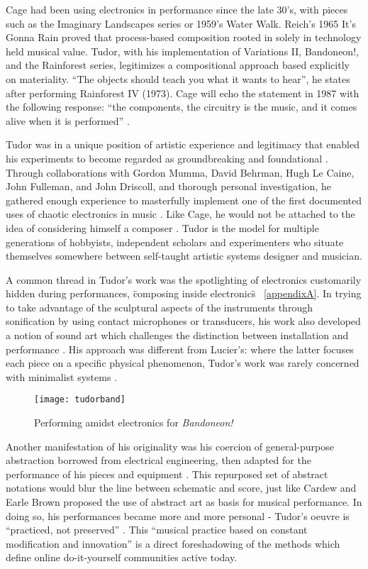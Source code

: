 \begin{itemize}
Cage had been using electronics in performance since the late 30’s, with pieces such as the Imaginary Landscapes series or 1959’s Water Walk. Reich’s 1965 It’s Gonna Rain proved that process-based composition rooted in solely in technology held musical value. Tudor, with his implementation of Variations II, Bandoneon!, and the Rainforest series, legitimizes a compositional approach based explicitly on materiality. “The objects should teach you what it wants to hear”, he states after performing Rainforest IV (1973). Cage will echo the statement in 1987 with the following response: “the components, the circuitry is the music, and it comes alive when it is performed” \citep{nakai2014}. 

Tudor was in a unique position of artistic experience and legitimacy that enabled his experiments to become regarded as groundbreaking and foundational \citep{collins2004}. Through collaborations with Gordon Mumma, David Behrman, Hugh Le Caine, John Fulleman, and John Driscoll, and thorough personal investigation, he gathered enough experience to masterfully implement one of the first documented uses of chaotic electronics in music \citep{kuivila2004}.  Like Cage, he would not be attached to the idea of considering himself a composer \citep{kuivila1998}. Tudor is the model for multiple generations of hobbyists, independent scholars and experimenters who situate themselves somewhere between self-taught artistic systems designer and musician. 

A common thread in Tudor’s work was the spotlighting of electronics customarily hidden during performances, \"composing inside electronics\" ~\ref{appendixA}. In trying to take advantage of the sculptural aspects of the instruments through sonification by using contact microphones or transducers, his work also developed a notion of sound art which challenges the distinction between installation and performance \citep{driscoll2004}. His approach was different from Lucier’s: where the latter focuses each piece on a specific physical phenomenon, Tudor’s work was rarely concerned with minimalist systems \citep{collins2004,driscoll2004}. 

	\begin{figure}[h!]
	  \caption{Performing amidst electronics for \emph{Bandoneon!}}
	  \centering
	    \texttt{[image: tudorband]}
	\end{figure}

Another manifestation of his originality was his coercion of general-purpose abstraction borrowed from electrical engineering, then adapted for the performance of his pieces and equipment \citep{kuivila2004}. This repurposed set of abstract notations would blur the line between schematic and score, just like Cardew and Earle Brown proposed the use of abstract art as basis for musical performance. In doing so, his performances became more and more personal - Tudor’s oeuvre is “practiced, not preserved” \citep{kuivila1998}. This “musical practice based on constant modification and innovation” \citep{driscoll2004} is a direct foreshadowing of the methods which define online do-it-yourself communities active today. 


\end{itemize}
